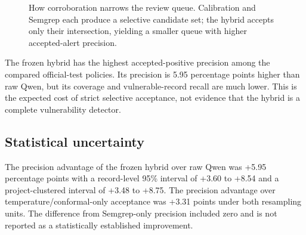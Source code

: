 \documentclass[pdflatex,sn-mathphys-num]{sn-jnl}
\begin{document}
\begin{figure}[htbp]
\centering
{}
\caption{How corroboration narrows the review queue. Calibration and Semgrep each produce a selective candidate set; the hybrid accepts only their intersection, yielding a smaller queue with higher accepted-alert precision.}
\label{fig:hybrid-funnel}
\end{figure}

The frozen hybrid has the highest accepted-positive precision among the compared official-test policies. Its precision is 5.95 percentage points higher than raw Qwen, but its coverage and vulnerable-record recall are much lower. This is the expected cost of strict selective acceptance, not evidence that the hybrid is a complete vulnerability detector.

\subsection{Statistical uncertainty}

The precision advantage of the frozen hybrid over raw Qwen was +5.95 percentage points with a record-level 95\% interval of +3.60 to +8.54 and a project-clustered interval of +3.48 to +8.75. The precision advantage over temperature/conformal-only acceptance was +3.31 points under both resampling units. The difference from Semgrep-only precision included zero and is not reported as a statistically established improvement.
\end{document}
